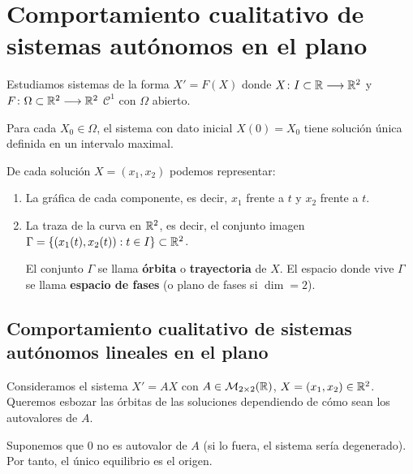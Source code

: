 \section{Comportamiento cualitativo de sistemas autónomos en el plano}

Estudiamos sistemas de la forma $\boxed{X'=F(X)}$ donde $X \colon I\subset \mathbb{R} \longrightarrow \mathbb{R}^2$ y $F \colon \Omega\subset \mathbb{R}^2 \longrightarrow \mathbb{R}^2$ $\mathcal{C}^1$ con $\Omega$ abierto.

Para cada $X_0 \in \Omega$, el sistema con dato inicial $X(0)=X_0$ tiene solución única definida en un intervalo maximal.

De cada solución $X = (x_1, x_2)$ podemos representar:
\begin{enumerate}
	\item La gráfica de cada componente, es decir, $x_1$ frente a $t$ y $x_2$ frente a $t$.
	\item La traza de la curva en $\mathbb{R}^2$, es decir, el conjunto imagen $\Gamma = \left\{\left(x_1(t), x_2(t)\right) : t\in I\right\} \subset \mathbb{R}^2$.

	      El conjunto $\Gamma$ se llama \textbf{órbita} o \textbf{trayectoria} de $X$. El espacio donde vive $\Gamma$ se llama \textbf{espacio de fases} (o plano de fases si $\dim = 2$).
\end{enumerate}

\subsection{Comportamiento cualitativo de sistemas autónomos lineales en el plano}

Consideramos el sistema $\boxed{X'=AX}$ con $A\in \mathcal{M}_{2\times 2}(\mathbb{R})$, $X=(x_1, x_2)\in \mathbb{R}^2$. Queremos esbozar las órbitas de las soluciones dependiendo de cómo sean los autovalores de $A$.

Suponemos que 0 no es autovalor de $A$ (si lo fuera, el sistema sería degenerado). Por tanto, el único equilibrio es el origen.

